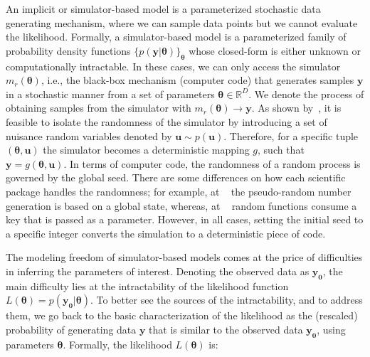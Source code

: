 \documentclass[nojss]{jss}
\newcommand{\ub}{\mathbf{u}}
\newcommand{\yb}{\mathbf{y}}
\newcommand{\thetab}{\boldsymbol{\theta}}
\newcommand{\simulator}{g}
\newcommand{\data}{\mathbf{y_0}}
\begin{document}
An implicit or simulator-based model is a parameterized stochastic
data generating mechanism, where we can sample data points but we
cannot evaluate the likelihood. Formally, a simulator-based model is a
parameterized family of probability density functions
\(\{ p(\yb|\thetab)\}_{\thetab}\) whose closed-form is either unknown
or computationally intractable. In these cases, we can only access the
simulator \( m_r(\thetab) \), i.e., the black-box mechanism (computer
code) that generates samples \(\yb\) in a stochastic manner from a set
of parameters \(\thetab \in \mathbb{R}^D\). We denote the process of
obtaining samples from the simulator with
\( m_r(\thetab) \rightarrow \yb \). As shown by~\citet{Meeds2015}, it
is feasible to isolate the randomness of the simulator by introducing
a set of nuisance random variables denoted by \(\ub \sim
p(\ub)\). Therefore, for a specific tuple \((\thetab, \ub)\) the
simulator becomes a deterministic mapping \(g\), such that
\(\yb=\simulator(\thetab,\ub)\). In terms of computer code, the
randomness of a random process is governed by the global seed. There
are some differences on how each scientific package handles the
randomness; for example, at ~\citet{harris2020array} the
pseudo-random number generation is based on a global state, whereas,
at ~\citet{jax2018github} random functions consume a key that
is passed as a parameter. However, in all cases, setting the initial
seed to a specific integer converts the simulation to a deterministic
piece of code.

The modeling freedom of simulator-based models comes at the price of
difficulties in inferring the parameters of interest. Denoting the
observed data as \(\data\), the main difficulty lies at the
intractability of the likelihood function
\(L(\thetab) = p(\data|\thetab)\). To better see the sources of the
intractability, and to address them, we go back to the basic
characterization of the likelihood as the (rescaled) probability of
generating data \(\yb\) that is similar to the observed data
\(\data\), using parameters \(\thetab\). Formally, the likelihood
\(L(\thetab)\) is:
\end{document}
